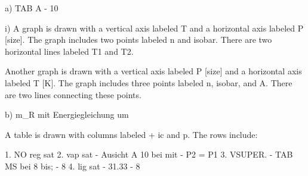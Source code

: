 a) TAB A - 10

i) A graph is drawn with a vertical axis labeled T and a horizontal axis labeled P [size]. The graph includes two points labeled n and isobar. There are two horizontal lines labeled T1 and T2.

Another graph is drawn with a vertical axis labeled P [size] and a horizontal axis labeled T [K]. The graph includes three points labeled n, isobar, and A. There are two lines connecting these points.

b) m_R mit Energiegleichung um

A table is drawn with columns labeled + ic and p. The rows include:

1. NO reg sat
2. vap sat - Ausicht A 10 bei mit - P2 = P1
3. VSUPER. - TAB MS bei 8 bis; - 8
4. lig sat - 31.33 - 8